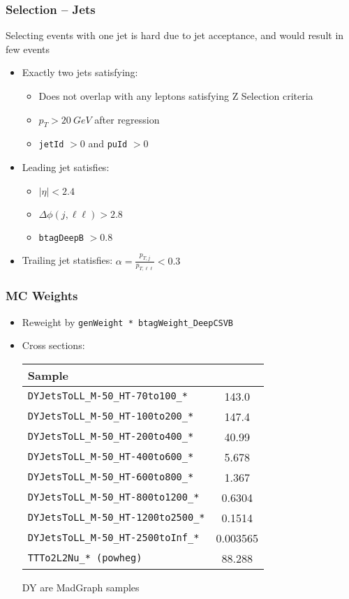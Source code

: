 \documentclass{beamer}
\begin{document}
\begin{frame}
  \frametitle{Selection -- Jets}

  Selecting events with one jet is hard due to jet acceptance,
  and would result in few events

  \vfill

  \begin{itemize}
  \item Exactly two jets satisfying:
    \begin{itemize}
    \item Does not overlap with any leptons satisfying Z Selection criteria
    \item $p_T > \SI{20}{GeV}$ after regression
    \item \texttt{jetId} $> 0$ and \texttt{puId} $> 0$
    \end{itemize}
  \item Leading jet satisfies:
    \begin{itemize}
    \item $|\eta| < 2.4$
    \item $\Delta\phi(j, \ell\ell) > 2.8$
    \item \texttt{btagDeepB} $> 0.8$
    \end{itemize}
  \item Trailing jet statisfies: $\alpha = \frac{p_{T, j}}{p_{T, \ell\ell}} < 0.3$
  \end{itemize}

\end{frame}


\begin{frame}
  \frametitle{MC Weights}

  \begin{itemize}
  \item Reweight by \texttt{genWeight * btagWeight\_DeepCSVB}
  \item Cross sections:
    \vfill
    \begin{tabular}{|l|S|}
      \hline
      Sample &  \\
      \hline
      \texttt{DYJetsToLL\_M-50\_HT-70to100\_*} & 143.0 \\
      \texttt{DYJetsToLL\_M-50\_HT-100to200\_*} & 147.4 \\
      \texttt{DYJetsToLL\_M-50\_HT-200to400\_*} & 40.99 \\
      \texttt{DYJetsToLL\_M-50\_HT-400to600\_*} & 5.678 \\
      \texttt{DYJetsToLL\_M-50\_HT-600to800\_*} & 1.367 \\
      \texttt{DYJetsToLL\_M-50\_HT-800to1200\_*} & 0.6304 \\
      \texttt{DYJetsToLL\_M-50\_HT-1200to2500\_*} & 0.1514 \\
      \texttt{DYJetsToLL\_M-50\_HT-2500toInf\_*} & 0.003565 \\
      \texttt{TTTo2L2Nu\_* (powheg)} & 88.288 \\
      \hline
    \end{tabular}
    \vfill
    DY are MadGraph samples
  \end{itemize}

\end{frame}
\end{document}

